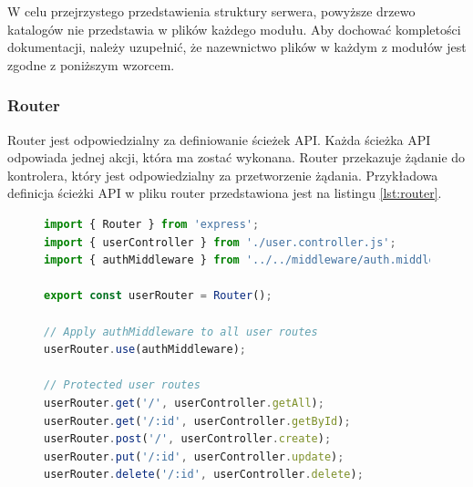 \begin{samepage}
\tiny
{}
\end{samepage}

W celu przejrzystego przedstawienia struktury serwera, powyższe drzewo katalogów nie przedstawia w plików każdego modułu. Aby dochować kompletości dokumentacji, należy uzupełnić, że nazewnictwo plików w każdym z modułów jest zgodne z poniższym wzorcem.


\subsubsection{Router}
Router jest odpowiedzialny za definiowanie ścieżek API. Każda ścieżka API odpowiada jednej akcji, która ma zostać wykonana. Router przekazuje żądanie do kontrolera, który jest odpowiedzialny za przetworzenie żądania. Przykładowa definicja ścieżki API w pliku router przedstawiona jest na listingu \ref{lst:router}.

\begin{figure}[H]   
\begin{lstlisting}[language=JavaScript, caption=Przykładowa definicja ścieżki API, label=lst:router]
import { Router } from 'express';
import { userController } from './user.controller.js';
import { authMiddleware } from '../../middleware/auth.middleware.js';

export const userRouter = Router();

// Apply authMiddleware to all user routes
userRouter.use(authMiddleware);

// Protected user routes
userRouter.get('/', userController.getAll);
userRouter.get('/:id', userController.getById);
userRouter.post('/', userController.create);
userRouter.put('/:id', userController.update);
userRouter.delete('/:id', userController.delete);
\end{lstlisting}
\end{figure}

